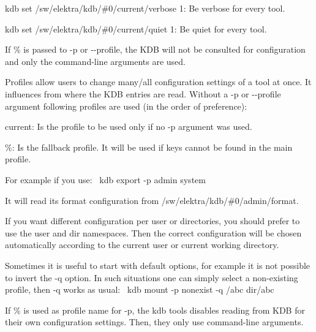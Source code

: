 \begin{DoxyItemize}
\item {\ttfamily kdb set /sw/elektra/kdb/\#0/current/verbose 1}\+: Be verbose for every tool.
\item {\ttfamily kdb set /sw/elektra/kdb/\#0/current/quiet 1}\+: Be quiet for every tool.
\end{DoxyItemize}

If {\ttfamily \%} is passed to {\ttfamily -\/p} or {\ttfamily -\/-\/profile}, the K\+DB will not be consulted for configuration and only the command-\/line arguments are used.

Profiles allow users to change many/all configuration settings of a tool at once. It influences from where the K\+DB entries are read. Without a {\ttfamily -\/p} or {\ttfamily -\/-\/profile} argument following profiles are used (in the order of preference)\+:


\begin{DoxyItemize}
\item {\ttfamily current}\+: Is the profile to be used only if no {\ttfamily -\/p} argument was used.
\item {\ttfamily \%}\+: Is the fallback profile. It will be used if keys cannot be found in the main profile.
\end{DoxyItemize}

For example if you use\+:~\newline
 {\ttfamily kdb export -\/p admin system}

It will read its format configuration from {\ttfamily /sw/elektra/kdb/\#0/admin/format}.

If you want different configuration per user or directories, you should prefer to use the {\ttfamily user} and {\ttfamily dir} namespaces. Then the correct configuration will be chosen automatically according to the current user or current working directory.

Sometimes it is useful to start with default options, for example it is not possible to invert the {\ttfamily -\/q} option. In such situations one can simply select a non-\/existing profile, then {\ttfamily -\/q} works as usual\+:~\newline
 {\ttfamily kdb mount -\/p nonexist -\/q /abc dir/abc}

If {\ttfamily \%} is used as profile name for {\ttfamily -\/p}, the {\ttfamily kdb} tools disables reading from {\ttfamily K\+DB} for their own configuration settings. Then, they only use command-\/line arguments.

